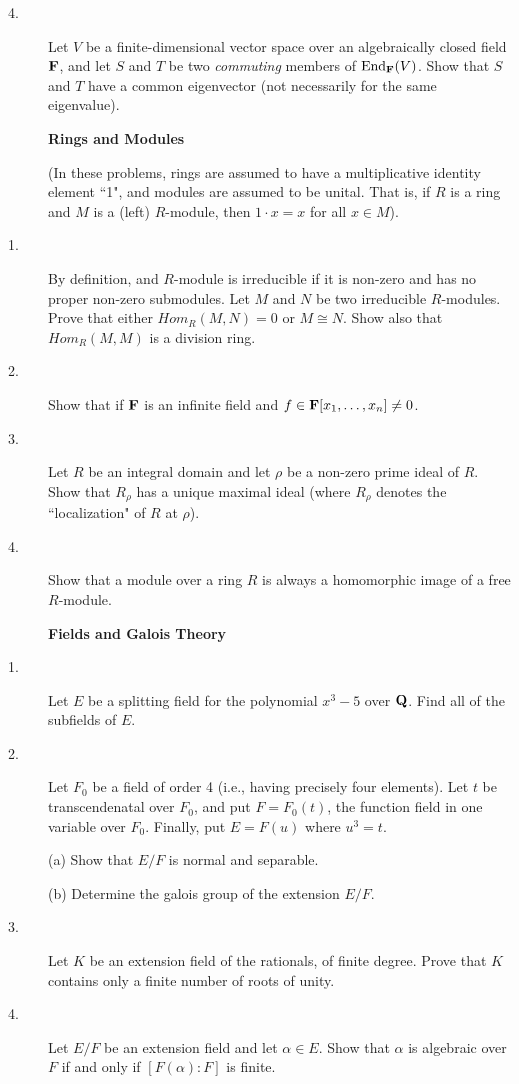 \documentclass{article}
\begin{document}
\begin{description}
\item[4.]
Let $V$ be a finite-dimensional vector space over an algebraically closed
field ${\bf F}$, and let $S$ and $T$ be two {\it commuting} members of
$\hbox{End}_{\bf F} (V)$. Show that $S$ and $T$ have a common eigenvector
(not necessarily for the same eigenvalue).

\centerline{{\bf Rings and Modules}}
(In these problems, rings are assumed to have a multiplicative identity
element ``1", and modules are assumed to be unital. That is, if $R$ is a ring
and $M$ is a (left) $R$-module, then $1 \cdot x=x$ for all $x \in M$).

\item[1.]
By definition, and $R$-module is irreducible if it is non-zero and has
no proper non-zero submodules. Let $M$ and $N$ be two irreducible $R$-modules.
Prove that either $Hom_R (M,N)=0$ or $M \cong N$. Show also that
$Hom_R(M,M)$ is a division ring.

\item[2.]
Show that if ${\bf F}$ is an infinite field and
$f \in {\bf F}[x_1, \dots, x_n] \neq 0$.

\item[3.]
Let $R$ be an integral domain and let $\rho$ be a non-zero prime ideal of $R$.
Show that $R_\rho$ has a unique maximal ideal (where $R_\rho$ denotes the
``localization" of $R$ at $\rho$).

\item[4.]
Show that a module over a ring $R$ is always a homomorphic image of a free
$R$-module.

\centerline{{\bf Fields and Galois Theory}}

\item[1.]
Let $E$ be a splitting field for the polynomial $x^3-5$ over ${\bf Q}$. Find
all of the subfields of $E$.

\item[2.]
Let $F_0$ be a field of order 4 (i.e., having precisely four elements). Let
$t$ be transcendenatal over $F_0$, and put $F = F_0 (t)$, the function
field in one variable over $F_0$. Finally, put $E=F(u)$ where $u^3=t$.

\item[\quad] (a)
Show that $E/F$ is normal and separable.

\item[\quad] (b)
Determine the galois group of the extension $E/F$.

\item[3.]
Let $K$ be an extension field of the rationals, of finite degree. Prove that
$K$ contains only a finite number of roots of unity.

\item[4.]
Let $E/F$ be an extension field and let $\alpha \in E$. Show that $\alpha$
is algebraic over $F$ if and only if $[F(\alpha) : F]$ is finite.






\end{description}    
\end{document}
